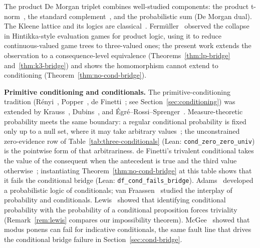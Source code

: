 \documentclass[11pt,a4paper]{article}
\begin{document}
The product De Morgan triplet combines well-studied components:
the product t-norm~\cite{klement2000,goguen1969},
the standard complement~\cite{bergmann2008},
and the probabilistic sum (De Morgan dual).
The Kleene lattice and its logics are
classical~\cite{kleene1952,asenjo1966,priest1979,priest2008,avron1991}.
Ferm\"uller~\cite{fermuller2014} observed the collapse in
Hintikka-style evaluation games for product logic, using it
to reduce continuous-valued game trees to three-valued ones;
the present work extends the observation to a consequence-level
equivalence (Theorems~\ref{thm:lp-bridge}
and~\ref{thm:k3-bridge}) and shows the homomorphism cannot
extend to conditioning (Theorem~\ref{thm:no-cond-bridge}).

\textbf{Primitive conditioning and conditionals.}
The primitive-conditioning tradition
(R\'enyi~\cite{renyi1955}, Popper~\cite{popper1959},
de Finetti~\cite{definetti1936,definetti1937};
see Section~\ref{sec:conditioning})
was extended by
Krauss~\cite{krauss1968}, Dubins~\cite{dubins1975},
and \'Egr\'e--Rossi--Sprenger~\cite{egre2021}.
Measure-theoretic probability meets the same boundary: a regular
conditional probability is fixed only up to a null set, where it
may take arbitrary values~\cite{kallenberg2021}; the unconstrained
zero-evidence row of Table~\ref{tab:three-conditionals}
(Lean: \texttt{cond\_zero\_zero\_univ}) is the pointwise form of
that arbitrariness.
de Finetti's trivalent conditional takes the value of the
consequent when the antecedent is true and the third value
otherwise~\cite{definetti1936,egre2021}; instantiating
Theorem~\ref{thm:no-cond-bridge} at this table shows that it
fails the conditional bridge
(Lean: \texttt{df\_cond\_fails\_bridge}).
Adams~\cite{adams1975} developed a probabilistic logic of
conditionals; van Fraassen~\cite{vanfraassen1976,vanfraassen1983}
studied the interplay of probability and conditionals.
Lewis~\cite{lewis1976} showed that identifying conditional
probability with the probability of a conditional proposition
forces triviality (Remark~\ref{rem:lewis} compares our
impossibility theorem).
McGee~\cite{mcgee1985} showed that modus ponens can fail for
indicative conditionals, the same
fault line that drives the conditional bridge failure in
Section~\ref{sec:cond-bridge}.
\end{document}
